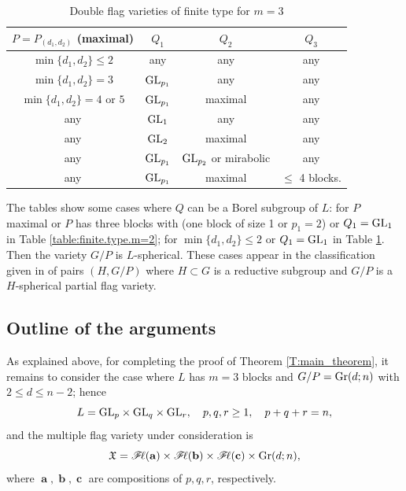 \documentclass[12pt,reqno]{amsart}
\begin{document}
\begin{table}[htbp]
%
\caption{Double flag varieties of finite type for $m=3$}\label{table:finite.type.m=3}
%
\begin{tabular}{||c|c|c|c||}
\hline
$P=P_{(d_1,d_2)}$ (maximal) & $Q_1$  &  $Q_2$ & $Q_3$ \\ \hline \hline
$\min\{d_1,d_2\}\leq 2$ & any & any & any \\ \hline
$\min\{d_1,d_2\}=3$ & $\mathrm{GL}_{p_1}$ & any & any \\ \hline
$\min\{d_1,d_2\}=4$ or $5$ & $\mathrm{GL}_{p_1}$ & maximal & any \\ \hline
any & $\mathrm{GL}_1$ & any & any \\ \hline
any & $\mathrm{GL}_2$ & maximal & any \\ \hline
any & $\mathrm{GL}_{p_1}$ & $\mathrm{GL}_{p_2}$ or mirabolic & any \\ \hline
any & $\mathrm{GL}_{p_1}$ & maximal & $\leq$ 4 blocks.
 \\ \hline
\end{tabular}
\hfil
\end{table}

\begin{remark}
The tables show some cases where $Q$ can be a Borel subgroup of $L$:
for $P$ maximal or $P$ has three blocks with (one block of size 1 or $p_1=2$) or $Q_1=\mathrm{GL}_1$ in Table \ref{table:finite.type.m=2};
for $\min\{d_1,d_2\}\leq 2$ or $Q_1=\mathrm{GL}_1$ in Table \ref{table:finite.type.m=3}. Then the variety $G/P$ is $L$-spherical. These cases appear  in the classification given in \cite{Avdeev.Petukhov.2014} of pairs $(H,G/P)$ where $H\subset G$ is a reductive subgroup and $G/P$ is a $H$-spherical partial flag variety.
\end{remark}

\subsection*{Outline of the arguments}
As explained above, for completing the proof of Theorem \ref{T:main_theorem}, it remains to consider the case where $L$ has $m=3$ blocks and $G/P=\mathrm{Gr}(d;n)$ with $2\leq d\leq n-2$; hence
$$
L=\mathrm{GL}_p\times \mathrm{GL}_q\times \mathrm{GL}_r,\quad p,q,r\geq 1,\quad p+q+r=n,
$$
and the multiple flag variety under consideration is
\begin{equation}
\label{X:3blocks}
\mathfrak{X}=\mathscr{F}\!\ell(\mathbf{a})\times \mathscr{F}\!\ell(\mathbf{b})\times \mathscr{F}\!\ell(\mathbf{c})\times \mathrm{Gr}(d;n) ,
\end{equation}
where $\mbfa,\mbfb,\mbfc$ are compositions of $p,q,r$, respectively.
\end{document}
